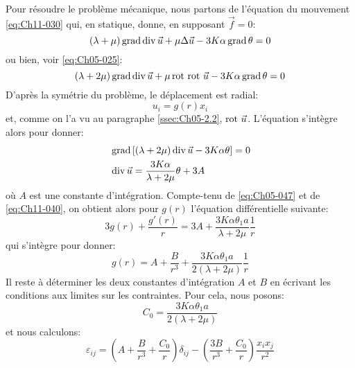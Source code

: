 Pour résoudre le problème mécanique, nous partons de l'équation du mouvement \eqref{eq:Ch11-030} qui, en statique, donne, en supposant $\vec{f}=0$: 
\begin{equation}
    (\lambda+\mu) \operatorname*{\mathrm{grad}} \operatorname*{\mathrm{div}} \vec{u} + \mu \Delta \vec{u} - 3K\alpha \operatorname*{\mathrm{grad}} \theta = 0
\end{equation}
ou bien, voir \eqref{eq:Ch05-025}: 
\begin{equation}
    (\lambda+2\mu) \operatorname*{\mathrm{grad}} \operatorname*{\mathrm{div}} \vec{u} + \mu \operatorname*{\mathrm{rot}\,} \operatorname*{\mathrm{rot}\,} \vec{u} - 3K\alpha \operatorname*{\mathrm{grad}} \theta = 0
    \label{eq:Ch11-041}
\end{equation}
D'après la symétrie du problème, le déplacement est radial: 
\begin{equation}
    u_i=g(r) x_i
    \label{eq:Ch11-042}
\end{equation}
et, comme on l'a vu au paragraphe \ref{ssec:Ch05-2.2}, $\operatorname*{\mathrm{rot}\,} \vec{u}$. L'équation s'intègre alors pour donner: 
\begin{subequations} 
\begin{align}
&\operatorname*{\mathrm{grad}}\left[(\lambda + 2 \mu) \operatorname*{\mathrm{div}} \vec{u} - 3 K \alpha \theta \right] = 0\\
&    \operatorname*{\mathrm{div}} \vec{u} = \frac{3K\alpha}{\lambda + 2 \mu} \theta + 3 A
    \label{eq:Ch11-043}
\end{align}
\end{subequations}
où $A$ est une constante d'intégration.
Compte-tenu de \eqref{eq:Ch05-047} et de \eqref{eq:Ch11-040}, on obtient alors pour $g(r)$ l'équation différentielle suivante: 
\begin{equation}
    3g(r)+\frac{g'(r)}{r} = 3A + \frac{3K\alpha\theta_1 a}{\lambda + 2 \mu}\frac{1}{r}
    \label{eq:Ch11-044}
\end{equation}
qui s'intègre pour donner: 
\begin{equation}
    g(r) = A + \frac{B}{r^3}+\frac{3K\alpha\theta_1 a}{2(\lambda + 2\mu)}\frac{1}{r}
    \label{eq:Ch11-045}
\end{equation}
Il reste à déterminer les deux constantes d'intégration $A$ et $B$ en écrivant les conditions aux limites sur les contraintes.
Pour cela, nous posons: 
\begin{equation}
    C_0 = \frac{3K\alpha\theta_1 a}{2(\lambda + 2\mu)}
    \label{eq:Ch11-046}
\end{equation}
et nous calculons: 
\begin{equation}
    \varepsilon_{ij}=\left(A+\frac{B}{r^3}+\frac{C_0}{r}\right)\delta_{ij}-\left(\frac{3B}{r^3}+\frac{C_0}{r}\right)\frac{x_ix_j}{r^2}
    \label{eq:Ch11-047}
\end{equation}
